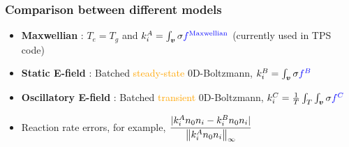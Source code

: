\documentclass[mathserif, aspectratio=169]{beamer}
\newcommand{\vect}[1]{\boldsymbol{#1}}
\newcommand{\norm}[1]{\left\lVert#1\right\rVert}
\begin{document}

\begin{frame}
	\frametitle{Comparison between different models}
	\begin{itemize}
		\item \textbf{Maxwellian} : $T_e=T_g$ and $k_i^{A} = \int_{\vect{v}} \sigma \textcolor{blue}{f^{\text{Maxwellian}}} $  (currently used in TPS code)%
		\item \textbf{Static E-field} : Batched \textcolor{orange}{steady-state} 0D-Boltzmann, $k_i^{B} = \int_{\vect{v}} \sigma \textcolor{blue}{f^{B}} $ 
		\item \textbf{Oscillatory E-field} : Batched \textcolor{orange}{transient} 0D-Boltzmann, $k_i^{C} = \frac{1}{T} \int_{T} \int_{\vect{v}} \sigma \textcolor{blue}{f^{C}} $ %
		\vspace{0.25in}
		\item Reaction rate errors, for example, $\cfrac{|k_i^{A} n_0 n_i  - k_i^{B} n_0 n_i|}{\norm{k_i^{A} n_0 n_i}_{\infty}}$ %
	\end{itemize}
\end{frame}
\end{document}
